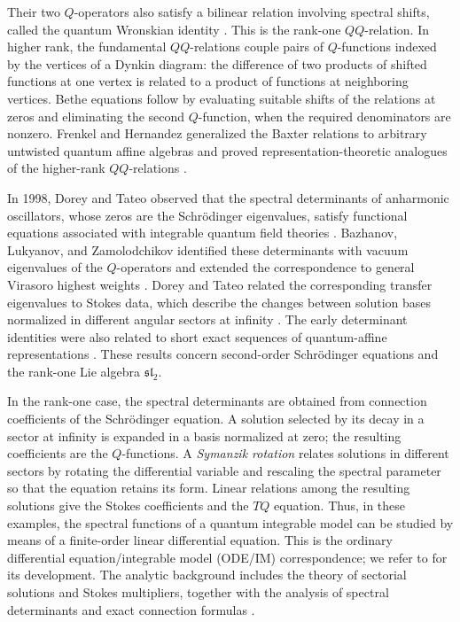 \documentclass[11pt,leqno]{amsart}
\numberwithin{equation}{section}
\theoremstyle{plain}
\theoremstyle{definition}
\theoremstyle{plain}
\theoremstyle{definition}
\theoremstyle{remark}
\begin{document}
Their two $Q$-operators also satisfy a bilinear relation involving spectral shifts, called the quantum Wronskian identity \cite{BLZ1997}.  This is the rank-one $QQ$-relation.  In higher rank, the fundamental $QQ$-relations couple pairs of $Q$-functions indexed by the vertices of a Dynkin diagram: the difference of two products of shifted functions at one vertex is related to a product of functions at neighboring vertices.  Bethe equations follow by evaluating suitable shifts of the relations at zeros and eliminating the second $Q$-function, when the required denominators are nonzero.  Frenkel and Hernandez generalized the Baxter relations to arbitrary untwisted quantum affine algebras \cite{FH2015} and proved representation-theoretic analogues of the higher-rank $QQ$-relations \cite{FrenkelHernandez2018}.

In 1998, Dorey and Tateo observed that the spectral determinants of anharmonic oscillators, whose zeros are the Schr\"odinger eigenvalues, satisfy functional equations associated with integrable quantum field theories \cite{DoreyTateo1999a}.  Bazhanov, Lukyanov, and Zamolodchikov identified these determinants with vacuum eigenvalues of the $Q$-operators and extended the correspondence to general Virasoro highest weights \cite{BLZ2001}.  Dorey and Tateo related the corresponding transfer eigenvalues to Stokes data, which describe the changes between solution bases normalized in different angular sectors at infinity \cite{DoreyTateo1999b}.  The early determinant identities were also related to short exact sequences of quantum-affine representations \cite{Suzuki1999}.  These results concern second-order Schr\"odinger equations and the rank-one Lie algebra $\mathfrak{sl}_2$.

In the rank-one case, the spectral determinants are obtained from connection coefficients of the Schr\"odinger equation.  A solution selected by its decay in a sector at infinity is expanded in a basis normalized at zero; the resulting coefficients are the $Q$-functions.  A \emph{Symanzik rotation} relates solutions in different sectors by rotating the differential variable and rescaling the spectral parameter so that the equation retains its form.  Linear relations among the resulting solutions give the Stokes coefficients and the $TQ$ equation.  Thus, in these examples, the spectral functions of a quantum integrable model can be studied by means of a finite-order linear differential equation.  This is the ordinary differential equation/integrable model (ODE/IM) correspondence; we refer to \cite{DDTReview2007} for its development.  The analytic background includes the theory of sectorial solutions and Stokes multipliers, together with the analysis of spectral determinants and exact connection formulas \cite{Sibuya1975,Voros1983}.
\end{document}
